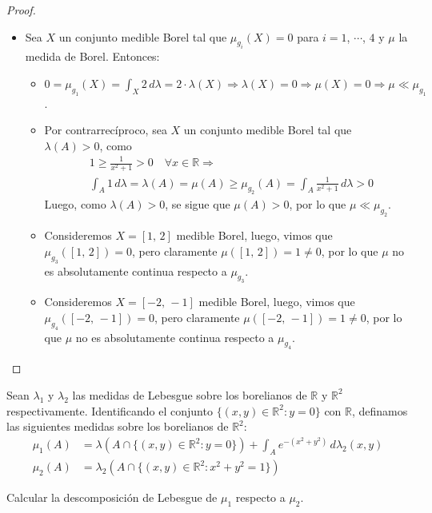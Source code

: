 \documentclass[12pt]{article}
\newenvironment{statement}[2][Ejercicio]{\begin{trivlist}
\item[\hskip \labelsep {\bfseries #1}\hskip \labelsep {\bfseries #2.}]}{\end{trivlist}}
\begin{document}
\begin{proof}
\begin{itemize}
\begin{itemize}
              \end{itemize}
        \item[(e)]  Sea \(X \) un conjunto medible Borel tal que \(\mu_{g_i}(X) = 0 \) para \(i = 1 \), \(\cdots \), \(4 \) y \(\mu \) la medida de Borel. Entonces: \begin{itemize}
                  \item[(i)] \(0 = \mu_{g_1}(X) = \int_X 2 \, d\lambda = 2 \cdot \lambda(X) \Rightarrow \lambda(X) = 0 \Rightarrow \mu(X) = 0 \Rightarrow \mu \ll \mu_{g_1} \).
                  \item[(ii)] Por contrarrecíproco, sea \(X \) un conjunto medible Borel tal que \(\lambda(A) > 0 \), como \begin{align*}
                             & 1 \geq \frac{1}{x^2 + 1} > 0 \quad \forall x \in \mathbb{R} \Rightarrow                                 \\
                             & \int_A 1 \, d\lambda = \lambda(A) = \mu(A) \geq \mu_{g_2}(A) = \int_A \frac{1}{x^2 + 1} \, d\lambda > 0
                        \end{align*}
                        Luego, como \(\lambda(A) > 0 \), se sigue que \(\mu(A) > 0 \), por lo que \(\mu \ll \mu_{g_2} \).
                  \item[(iii)] Consideremos \(X = [1\text{, }2] \) medible Borel, luego, vimos que \(\mu_{g_3}([1\text{, }2]) = 0 \), pero claramente \(\mu([1\text{, }2]) = 1 \neq 0 \), por lo que \(\mu \) no es absolutamente continua respecto a \(\mu_{g_3} \).
                  \item[(iv)] Consideremos \(X = [-2\text{, }-1] \) medible Borel, luego, vimos que \(\mu_{g_4}([-2\text{, }-1]) = 0 \), pero claramente \(\mu([-2\text{, }-1]) = 1 \neq 0 \), por lo que \(\mu \) no es absolutamente continua respecto a \(\mu_{g_4} \).
              \end{itemize}
    \end{itemize}
\end{proof}

\begin{statement}{11}
    Sean \(\lambda_1 \) y \(\lambda_2 \) las medidas de Lebesgue sobre los borelianos de \(\mathbb{R} \) y \(\mathbb{R}^2 \) respectivamente. Identificando el conjunto \(\{(x, y) \in \mathbb{R}^2 : y = 0\} \) con \(\mathbb{R} \), definamos las siguientes medidas sobre los borelianos de \(\mathbb{R}^2 \):
    \begin{align*}
        \mu_1(A) & = \lambda(A \cap \{(x, y) \in \mathbb{R}^2 : y = 0\}) + \int_A e^{-(x^2 + y^2)} \, d\lambda_2(x, y) \\
        \mu_2(A) & = \lambda_2(A \cap \{(x, y) \in \mathbb{R}^2 : x^2 + y^2 = 1\})
    \end{align*}

    Calcular la descomposición de Lebesgue de \(\mu_1 \) respecto a \(\mu_2 \).
\end{statement}
\end{document}
